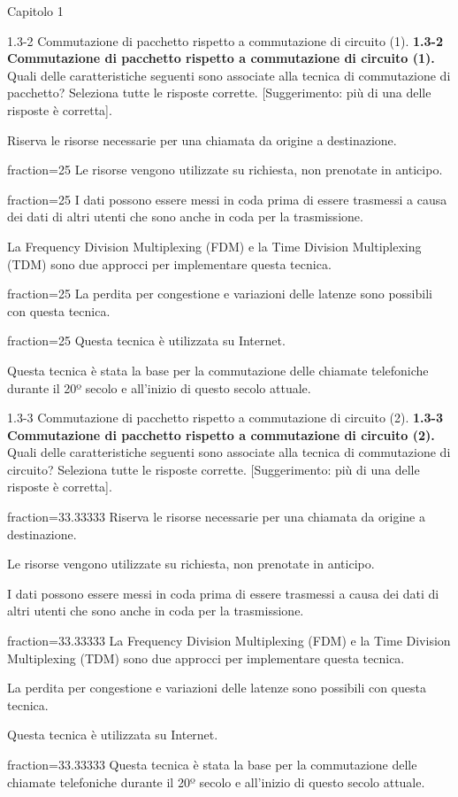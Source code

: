 \documentclass[a4paper]{article}
\begin{document}
\begin{quiz}{Capitolo 1}
\begin{multi}[points=1,shuffle=true,multiple]{1.3-2 Commutazione di pacchetto rispetto a commutazione di circuito (1).}
\textbf{1.3-2 Commutazione di pacchetto rispetto a commutazione di circuito (1).} 
Quali delle caratteristiche seguenti sono associate alla tecnica di commutazione di pacchetto? Seleziona tutte le risposte corrette. [Suggerimento: più di una delle risposte è corretta].
\item Riserva le risorse necessarie per una chiamata da origine a destinazione.
\item[fraction=25] Le risorse vengono utilizzate su richiesta, non prenotate in anticipo.
\item[fraction=25] I dati possono essere messi in coda prima di essere trasmessi a causa dei dati di altri utenti che sono anche in coda per la trasmissione.
\item La Frequency Division Multiplexing (FDM) e la Time Division Multiplexing (TDM) sono due approcci per implementare questa tecnica.
\item[fraction=25] La perdita per congestione e variazioni delle latenze sono possibili con questa tecnica.
\item[fraction=25] Questa tecnica è utilizzata su Internet.
\item Questa tecnica è stata la base per la commutazione delle chiamate telefoniche durante il 20º secolo e all'inizio di questo secolo attuale.
\end{multi}

\begin{multi}[points=1,shuffle=true,multiple]{1.3-3 Commutazione di pacchetto rispetto a commutazione di circuito (2).}
\textbf{1.3-3 Commutazione di pacchetto rispetto a commutazione di circuito (2).} 
Quali delle caratteristiche seguenti sono associate alla tecnica di commutazione di circuito? Seleziona tutte le risposte corrette. [Suggerimento: più di una delle risposte è corretta].
\item[fraction=33.33333] Riserva le risorse necessarie per una chiamata da origine a destinazione.
\item Le risorse vengono utilizzate su richiesta, non prenotate in anticipo.
\item I dati possono essere messi in coda prima di essere trasmessi a causa dei dati di altri utenti che sono anche in coda per la trasmissione.
\item[fraction=33.33333] La Frequency Division Multiplexing (FDM) e la Time Division Multiplexing (TDM) sono due approcci per implementare questa tecnica.
\item La perdita per congestione e variazioni delle latenze sono possibili con questa tecnica.
\item Questa tecnica è utilizzata su Internet.
\item[fraction=33.33333] Questa tecnica è stata la base per la commutazione delle chiamate telefoniche durante il 20º secolo e all'inizio di questo secolo attuale.
\end{multi}


\end{quiz}
\end{document}
